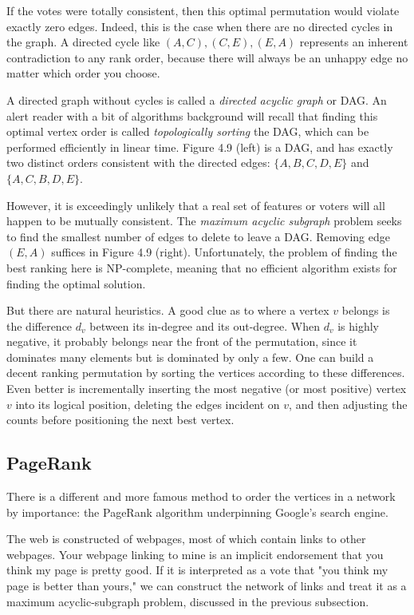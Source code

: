 \documentclass[10pt]{article}
\begin{document}
If the votes were totally consistent, then this optimal permutation would violate exactly zero edges. Indeed, this is the case when there are no directed cycles in the graph. A directed cycle like $(A, C), (C, E), (E, A)$ represents an inherent contradiction to any rank order, because there will always be an unhappy edge no matter which order you choose.

A directed graph without cycles is called a \textit{directed acyclic graph} or DAG. An alert reader with a bit of algorithms background will recall that finding this optimal vertex order is called \textit{topologically sorting} the DAG, which can be performed efficiently in linear time. Figure 4.9 (left) is a DAG, and has exactly two distinct orders consistent with the directed edges: $\{A, B, C, D, E\}$ and $\{A, C, B, D, E\}$.

However, it is exceedingly unlikely that a real set of features or voters will all happen to be mutually consistent. The \textit{maximum acyclic subgraph} problem seeks to find the smallest number of edges to delete to leave a DAG. Removing edge $(E, A)$ suffices in Figure 4.9 (right). Unfortunately, the problem of finding the best ranking here is NP-complete, meaning that no efficient algorithm exists for finding the optimal solution.

But there are natural heuristics. A good clue as to where a vertex $v$ belongs is the difference $d_v$ between its in-degree and its out-degree. When $d_v$ is highly negative, it probably belongs near the front of the permutation, since it dominates many elements but is dominated by only a few. One can build a decent ranking permutation by sorting the vertices according to these differences. Even better is incrementally inserting the most negative (or most positive) vertex $v$ into its logical position, deleting the edges incident on $v$, and then adjusting the counts before positioning the next best vertex.
\subsection{PageRank}

There is a different and more famous method to order the vertices in a network by importance: the PageRank algorithm underpinning Google's search engine.

The web is constructed of webpages, most of which contain links to other webpages. Your webpage linking to mine is an implicit endorsement that you think my page is pretty good. If it is interpreted as a vote that "you think my page is better than yours," we can construct the network of links and treat it as a maximum acyclic-subgraph problem, discussed in the previous subsection.
\end{document}
